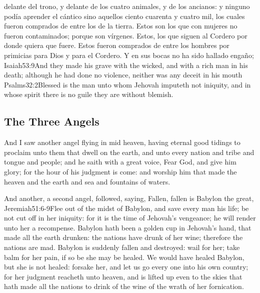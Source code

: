  delante del trono, y delante de los cuatro animales, y de los ancianos: y ninguno podía aprender el cántico sino aquellos ciento cuarenta y cuatro mil, los cuales fueron comprados de entre los de la tierra. 
Estos son los que con mujeres no fueron contaminados; porque son vírgenes. Estos, los que siguen al Cordero por donde quiera que fuere. Estos fueron comprados de entre los hombres por primicias para Dios y para el Cordero. 
Y en sus bocas no ha sido hallado engaño;%
				   {Isaiah}{53:9}{And they made his grave with the wicked, and with a rich man in his death; although he had done no violence, neither was any deceit in his mouth}%
				   {Psalms}{32:2}{Blessed is the man unto whom Jehovah imputeth not iniquity, and in whose spirit there is no guile}
 they are without blemish.
\subsection*{The Three Angels}
And I saw another angel flying in mid heaven, having eternal good tidings to proclaim unto them that dwell on the earth, and unto every nation and tribe and tongue and people; 
and he saith with a great voice, Fear God, and give him glory; for the hour of his judgment is come: and worship him that made the heaven and the earth and sea and fountains of waters.

And another, a second angel, followed, saying, Fallen, fallen is Babylon the great,%
				  {Jeremiah}{51:6-9}{Flee out of the midst of Babylon, and save every man his life; be not cut off in her iniquity: for it is the time of Jehovah’s vengeance; he will render unto her a recompense. Babylon hath been a golden cup in Jehovah’s hand, that made all the earth drunken: the nations have drunk of her wine; therefore the nations are mad. Babylon is suddenly fallen and destroyed: wail for her; take balm for her pain, if so be she may be healed. We would have healed Babylon, but she is not healed: forsake her, and let us go every one into his own country; for her judgment reacheth unto heaven, and is lifted up even to the skies}
 that hath made all the nations to drink of the wine of the wrath of her fornication.

